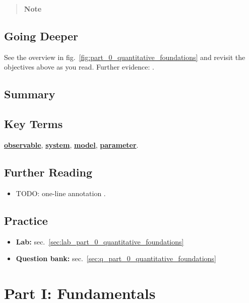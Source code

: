 \documentclass[
]{article}
\providecommand{\tightlist}{%
  \setlength{\itemsep}{0pt}\setlength{\parskip}{0pt}}
\theoremstyle{plain}
\theoremstyle{definition}
\begin{document}
\begin{quote}
\textbf{Note}
\end{quote}

\subsection{Going Deeper}\label{going-deeper-2}

See the overview in fig.~\ref{fig:part_0_quantitative_foundations} and
revisit the objectives above as you read. Further evidence:
\citep{smith2020foundations, doe2019methods}.

\subsection{Summary}\label{summary-2}

\subsection{Key Terms}\label{key-terms-2}

\hyperref[gl:observable]{\textbf{observable}},
\hyperref[gl:system]{\textbf{system}},
\hyperref[gl:model]{\textbf{model}},
\hyperref[gl:parameter]{\textbf{parameter}}.

\subsection{Further Reading}\label{further-reading-2}

\begin{itemize}
\item
  TODO: one-line annotation \citep{lee2021systems}.
\end{itemize}

\subsection{Practice}\label{practice-2}

\begin{itemize}
\tightlist
\item
  \textbf{Lab:} sec.~\ref{sec:lab_part_0_quantitative_foundations}
\item
  \textbf{Question bank:}
  sec.~\ref{sec:q_part_0_quantitative_foundations}
\end{itemize}

\newpage

\section{Part I: Fundamentals}\label{sec:part_I_intro}
\end{document}

